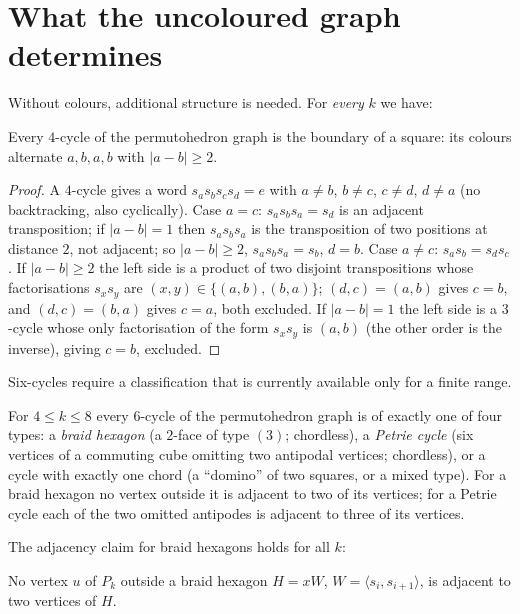 \section{What the uncoloured graph determines}\label{sec:graph-only}
Without colours, additional structure is needed. For \emph{every} $k$ we have:
\begin{lemma}\label{lem:four-cycles}
Every $4$-cycle of the permutohedron graph is the boundary of a square: its colours alternate $a,b,a,b$ with $|a-b|\ge2$.
\end{lemma}
\begin{proof}
A $4$-cycle gives a word $s_as_bs_cs_d=e$ with $a\ne b$, $b\ne c$, $c\ne d$, $d\ne a$ (no backtracking, also cyclically). Case $a=c$: $s_as_bs_a=s_d$ is an adjacent transposition; if $|a-b|=1$ then $s_as_bs_a$ is the transposition of two positions at distance $2$, not adjacent; so $|a-b|\ge2$, $s_as_bs_a=s_b$, $d=b$. Case $a\ne c$: $s_as_b=s_ds_c$. If $|a-b|\ge2$ the left side is a product of two disjoint transpositions whose factorisations $s_xs_y$ are $(x,y)\in\{(a,b),(b,a)\}$; $(d,c)=(a,b)$ gives $c=b$, and $(d,c)=(b,a)$ gives $c=a$, both excluded. If $|a-b|=1$ the left side is a $3$-cycle whose only factorisation of the form $s_xs_y$ is $(a,b)$ (the other order is the inverse), giving $c=b$, excluded.
\end{proof}
Six-cycles require a classification that is currently available only for a finite range.
\begin{lemma}\label{lem:six-cycles}
For $4\le k\le8$ every $6$-cycle of the permutohedron graph is of exactly one of four types: a \emph{braid hexagon} (a $2$-face of type $(3)$; chordless), a \emph{Petrie cycle} (six vertices of a commuting cube omitting two antipodal vertices; chordless), or a cycle with exactly one chord (a ``domino'' of two squares, or a mixed type). For a braid hexagon no vertex outside it is adjacent to two of its vertices; for a Petrie cycle each of the two omitted antipodes is adjacent to three of its vertices.
\end{lemma}
The adjacency claim for braid hexagons holds for all $k$:
\begin{lemma}\label{lem:braid-isolated}
No vertex $u$ of $P_k$ outside a braid hexagon $H=xW$, $W=\langle s_i,s_{i+1}\rangle$, is adjacent to two vertices of $H$.
\end{lemma}
